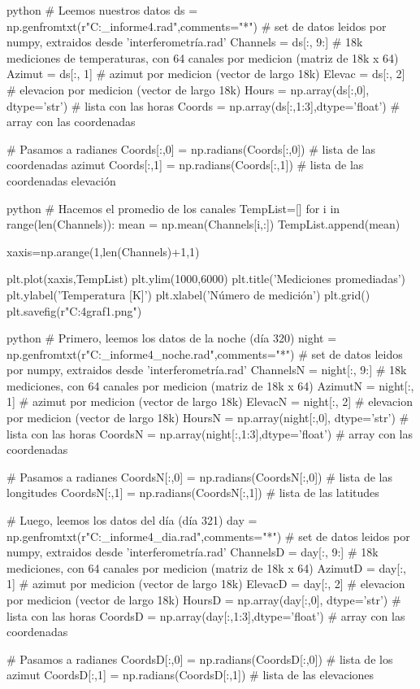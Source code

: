 \begin{sourcecode}[\label{codigo-python}]{python}
# Leemos nuestros datos
ds = np.genfromtxt(r"C:\Users\Usuario\Downloads\datos_informe4.rad",comments="*") # set de datos leidos por numpy, extraidos desde 'interferometría.rad'
Channels = ds[:, 9:] # 18k mediciones de temperaturas, con 64 canales por medicion (matriz de 18k x 64)
Azimut = ds[:, 1] # azimut por medicion (vector de largo 18k)
Elevac = ds[:, 2] # elevacion por medicion (vector de largo 18k)
Hours = np.array(ds[:,0], dtype='str') # lista con las horas
Coords = np.array(ds[:,1:3],dtype='float') # array con las coordenadas

# Pasamos a radianes
Coords[:,0] = np.radians(Coords[:,0]) # lista de las coordenadas azimut
Coords[:,1] = np.radians(Coords[:,1]) # lista de las coordenadas elevación
\end{sourcecode}

\begin{sourcecode}[\label{codigo-python}]{python}
# Hacemos el promedio de los canales
TempList=[]
for i in range(len(Channels)):
    mean = np.mean(Channels[i,:])
    TempList.append(mean)

xaxis=np.arange(1,len(Channels)+1,1) 

plt.plot(xaxis,TempList)
plt.ylim(1000,6000)
plt.title('Mediciones promediadas')
plt.ylabel('Temperatura [K]')
plt.xlabel('Número de medición')
plt.grid()
plt.savefig(r"C:\Users\Usuario\Downloads\inf4graf1.png")
\end{sourcecode}

\begin{sourcecode}[\label{codigo-python}]{python}
# Primero, leemos los datos de la noche (día 320)
night = np.genfromtxt(r"C:\Users\Usuario\Downloads\datos_informe4_noche.rad",comments="*") # set de datos leidos por numpy, extraidos desde 'interferometría.rad'
ChannelsN = night[:, 9:] # 18k mediciones, con 64 canales por medicion (matriz de 18k x 64)
AzimutN = night[:, 1] # azimut por medicion (vector de largo 18k)
ElevacN = night[:, 2] # elevacion por medicion (vector de largo 18k)
HoursN = np.array(night[:,0], dtype='str') # lista con las horas
CoordsN = np.array(night[:,1:3],dtype='float') # array con las coordenadas

# Pasamos a radianes
CoordsN[:,0] = np.radians(CoordsN[:,0]) # lista de las longitudes
CoordsN[:,1] = np.radians(CoordsN[:,1]) # lista de las latitudes

# Luego, leemos los datos del día (día 321)
day = np.genfromtxt(r"C:\Users\Usuario\Downloads\datos_informe4_dia.rad",comments="*") # set de datos leidos por numpy, extraidos desde 'interferometría.rad'
ChannelsD = day[:, 9:] # 18k mediciones, con 64 canales por medicion (matriz de 18k x 64)
AzimutD = day[:, 1] # azimut por medicion (vector de largo 18k)
ElevacD = day[:, 2] # elevacion por medicion (vector de largo 18k)
HoursD = np.array(day[:,0], dtype='str') # lista con las horas
CoordsD = np.array(day[:,1:3],dtype='float') # array con las coordenadas

# Pasamos a radianes
CoordsD[:,0] = np.radians(CoordsD[:,0]) # lista de los azimut
CoordsD[:,1] = np.radians(CoordsD[:,1]) # lista de las elevaciones
\end{sourcecode}

